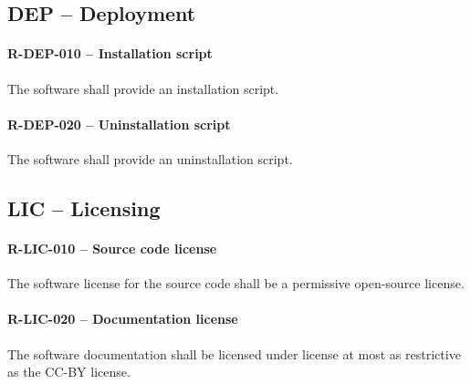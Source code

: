 \subsection{DEP -- Deployment}
\paragraph{R-DEP-010 -- Installation script}
The software shall provide an installation script.

\paragraph{R-DEP-020 -- Uninstallation script}
The software shall provide an uninstallation script.

\subsection{LIC -- Licensing}
\paragraph{R-LIC-010 -- Source code license}
The software license for the source code shall be a permissive open-source
license.

\paragraph{R-LIC-020 -- Documentation license}
The software documentation shall be licensed under license at most as
restrictive as the CC-BY license.